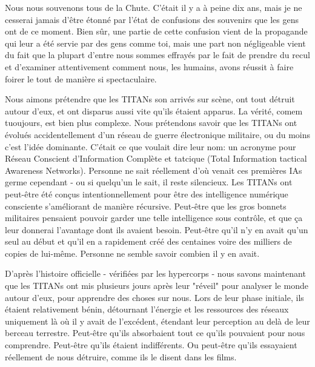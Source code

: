 Nous nous souvenons tous de la Chute. C'était il y a à peine dix ans, mais je ne cesserai jamais d'être étonné par l'état de confusions des souvenirs que les gens ont de ce moment. Bien sûr, une partie de cette confusion vient de la propagande qui leur a été servie par des gens comme toi, mais une part non négligeable vient du fait que la plupart d'entre nous sommes effrayés par le fait de prendre du recul et d'examiner attentivement comment nous, les humains, avons réussit à faire foirer le tout de manière si spectaculaire. 

Nous aimons prétendre que les TITANs son arrivés sur scène, ont tout détruit autour d'eux, et ont disparus aussi vite qu'ils étaient apparus. La vérité, comem tuoujours, est bien plus complexe. Nous prétendons savoir que les TITANs ont évolués accidentellement d'un réseau de guerre électronique militaire, ou du moins c'est l'idée dominante. C'était ce que voulait dire leur nom: un acronyme pour Réseau Conscient d'Information Complète et tatcique (Total Information tactical Awareness Networks). Personne ne sait réellement d'où venait ces premières IAs germe cependant - ou si quelqu'un le sait, il reste silencieux. Les TITANs ont peut-être été conçus intentionnellement pour être des intelligence numérique consciente s'améliorant de manière récursive. Peut-être que les gros bonnets militaires pensaient pouvoir garder une telle intelligence sous contrôle, et que ça leur donnerai l'avantage dont ils avaient besoin. Peut-être qu'il n'y en avait qu'un seul au début et qu'il en a rapidement créé des centaines voire des milliers de copies de lui-même. Personne ne semble savoir combien il y en avait. 

D'après l'histoire officielle - vérifiées par les hypercorps - nous savons maintenant que les TITANs ont mis plusieurs jours après leur "réveil" pour analyser le monde autour d'eux, pour apprendre des choses sur nous. Lors de leur phase initiale, ils étaient relativement bénin, détournant l'énergie et les ressources des réseaux uniquement là où il y avait de l'excédent, étendant leur perception au delà de leur berceau terrestre. Peut-être qu'ils absorbaient tout ce qu'ils pouvaient pour nous comprendre. Peut-être qu'ils étaient indifférents. Ou peut-être qu'ils essayaient réellement de nous détruire, comme ils le disent dans les films. 


